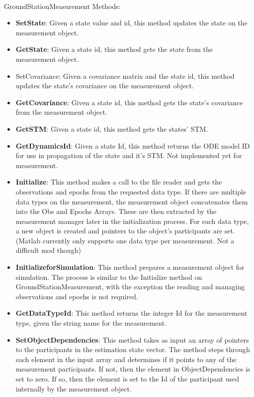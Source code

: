 \paragraph{}GroundStationMeasurement Methods:

\begin{itemize}
\item \textbf{SetState}:  Given a state value and id, this method updates the state on the measurement object.
\item \textbf{GetState}:  Given a state id, this method gets the state from the measurement object.
\item SetCovariance:  Given a covariance matrix and the state id, this method updates the state's covariance on the measurement object.
\item \textbf{GetCovariance}:  Given a state id, this method gets the state's covariance from the measurement object.
\item \textbf{GetSTM}: Given a state id, this method gets the states' STM.
\item \textbf{GetDynamicsId}:  Given a state Id, this method returns the ODE model ID for use in propagation of the state and it's STM.  Not implemented yet for measurement.
\item \textbf{Initialize}:  This method makes a call to the file reader and gets the observations and epochs from the requested data type.  If there are multiple data types on the measurement, the measurement object concatenates them into the Obs and Epochs Arrays.  These are then extracted by the measurement manager later in the initialization process.     For each data type, a new object is created and pointers to the object's participants are set.  (Matlab currently only supports one data type per measurement.  Not a difficult mod though)
\item \textbf{InitializeforSimulation}:  This method prepares a measurement object for simulation.  The process is similar to the Initialize method on GroundStationMeasurement, with the exception the reading and managing observations and epochs is not required.
\item \textbf{GetDataTypeId}:  This method returns the integer Id for the measurement type, given the string name for the measurement.
\item \textbf{SetObjectDependencies}:  This method takes as input an array of pointers to the participants in the estimation state vector.   The method steps through each element in the input array and determines if it points to any of the measurement participants.   If not, then the element in ObjectDependencies is set to zero.  If so, then the element is set to the Id of the participant used internally by the measurement object.
\end{itemize}

